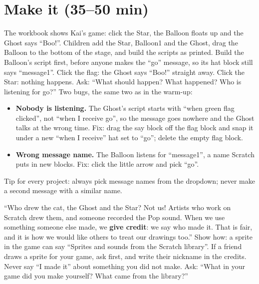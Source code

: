 \section{Make it (35--50 min)}
\begin{bughunt}
The workbook shows Kai's game: click the Star, the Balloon floats up and the Ghost says \enquote{Boo!}. Children add the Star, Balloon1 and the Ghost, drag the Balloon to the bottom of the stage, and build the scripts as printed. Build the Balloon's script first, before anyone makes the \enquote{go} message, so its hat block still says \enquote{message1}. Click the flag: the Ghost says \enquote{Boo!} straight away. Click the Star: nothing happens. Ask: \enquote{What should happen? What happened? Who is listening for go?} Two bugs, the same two as in the warm-up:
\begin{itemize}[leftmargin=1.2em,itemsep=1pt]
  \item \textbf{Nobody is listening.} The Ghost's script starts with \enquote{when green flag clicked}, not \enquote{when I receive go}, so the message goes nowhere and the Ghost talks at the wrong time. Fix: drag the say block off the flag block and snap it under a new \enquote{when I receive} hat set to \enquote{go}; delete the empty flag block.
  \item \textbf{Wrong message name.} The Balloon listens for \enquote{message1}, a name Scratch puts in new blocks. Fix: click the little arrow and pick \enquote{go}.
\end{itemize}
Tip for every project: always pick message names from the dropdown; never make a second message with a similar name.
\end{bughunt}

\begin{safety}
\enquote{Who drew the cat, the Ghost and the Star? Not us! Artists who work on Scratch drew them, and someone recorded the Pop sound. When we use something someone else made, we \textbf{give credit}: we say who made it. That is fair, and it is how we would like others to treat our drawings too.} Show how: a sprite in the game can say \enquote{Sprites and sounds from the Scratch library}. If a friend draws a sprite for your game, ask first, and write their nickname in the credits. Never say \enquote{I made it} about something you did not make. Ask: \enquote{What in your game did you make yourself? What came from the library?}
\end{safety}

